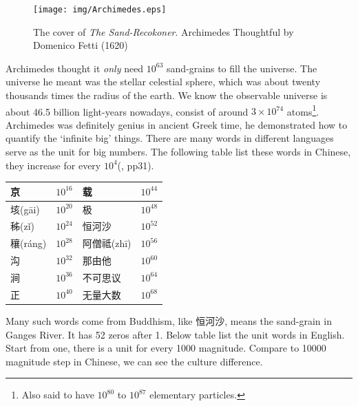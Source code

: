 \documentclass{article}
\begin{document}
\begin{figure}[htbp]
 \centering
 \texttt{[image: img/Archimedes.eps]}
 \captionsetup{labelformat=empty}
 \caption{The cover of {\em The Sand-Recokoner}. Archimedes Thoughtful by Domenico Fetti (1620)}
 \label{fig:Archimedes}
\end{figure}

Archimedes thought it {\em only} need $10^{63}$ sand-grains to fill the universe. The universe he meant was the stellar celestial sphere, which was about twenty thousands times the radius of the earth. We know the observable universe is about 46.5 billion light-years nowadays, consist of around $3 \times 10^{74}$ atoms\footnote{Also said to have $10^{80}$ to $10^{87}$ elementary particles.}. Archimedes was definitely genius in ancient Greek time, he demonstrated how to quantify the `infinite big' things. There are many words in different languages serve as the unit for big numbers. The following table list these words in Chinese, they increase for every $10^4$(\cite{Noguchi2007}, pp31).

\begin{center}
\begin{tabular}{|l|r|l|r|}
\hline
{\fontspec{\cnmainft}京}            & $10^{16}$ & {\fontspec{\cnmainft}载}            & $10^{44}$ \\
\hline
{\fontspec{\cnmainft}垓}(g\={a}i)   & $10^{20}$ & {\fontspec{\cnmainft}极}            & $10^{48}$ \\
\hline
{\fontspec{\cnmainft}秭}(z\v{i})    & $10^{24}$ & {\fontspec{\cnboldft}恒河沙}  & $10^{52}$ \\
\hline
{\fontspec{\cnmainft}穰}(r\'{a}ng)  & $10^{28}$ & {\fontspec{\cnmainft}阿僧祗}(zh\={i})  & $10^{56}$ \\
\hline
{\fontspec{\cnmainft}沟}            & $10^{32}$ & {\fontspec{\cnmainft}那由他}        & $10^{60}$ \\
\hline
{\fontspec{\cnmainft}涧}            & $10^{36}$ & {\fontspec{\cnmainft}不可思议}      & $10^{64}$ \\
\hline
{\fontspec{\cnmainft}正}            & $10^{40}$ & {\fontspec{\cnmainft}无量大数}      & $10^{68}$ \\
\hline
\end{tabular}
\end{center}

Many such words come from Buddhism, like {\fontspec{\cnmainft}恒河沙}, means the sand-grain in Ganges River. It has 52 zeros after 1. Below table list the unit words in English. Start from one, there is a unit for every 1000 magnitude. Compare to 10000 magnitude step in Chinese, we can see the culture difference.
\end{document}
